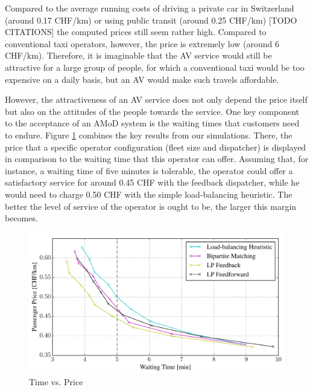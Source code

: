 Compared to the average running costs of driving a private car in Switzerland
(around 0.17 CHF/km)  or using public transit (around 0.25 CHF/km) [TODO CITATIONS]
the computed prices still seem rather high. Compared to conventional taxi operators, however, the price is extremely low (around 6 CHF/km). Therefore, it is imaginable that the AV service would still be attractive for a large group of people, for which a conventional taxi would be too expensive on a daily basis, but an AV would make such travels affordable.

However, the attractiveness of an AV service does not only depend the price itself but also on the attitudes of the people towards the service. One key component to the acceptance of an AMoD system is the waiting times that customers need to endure.
Figure \ref{fig:time_vs_price} combines the key results from our simulations. There, the price that a specific operator configuration (fleet size and dispatcher) is displayed in comparison to the waiting time that this operator can offer.
Assuming that, for instance, a waiting time of five minutes is tolerable, the operator could offer a satisfactory service for around 0.45 CHF with the feedback dispatcher, while he would need to charge 0.50 CHF with the simple load-balancing heuristic. The better the level of service of the operator is ought to be, the larger
this margin becomes.

\begin{figure}
\includegraphics[width=1.0\textwidth]{figures/time_vs_price.pdf}
\caption{Time vs. Price}
\label{fig:time_vs_price}
\end{figure}
